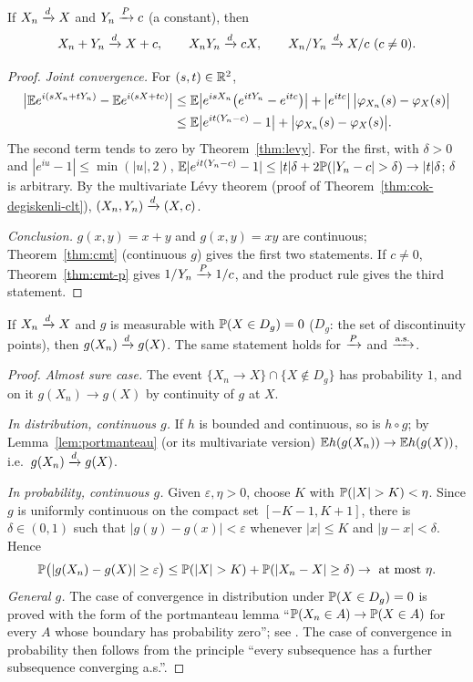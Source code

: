 \documentclass[main.tex]{subfiles}
\begin{document}
\begin{theorem}\label{thm:slutsky}
If $X_n\dto X$ and $Y_n\pto c$ (a constant), then
\[
X_n+Y_n\dto X+c,\qquad X_nY_n\dto cX,\qquad X_n/Y_n\dto X/c\ (c\neq0).
\]
\end{theorem}
\begin{proof}
\emph{Joint convergence.} For $(s,t)\in\R^2$,
\begin{align*}
\big|\E e^{i(sX_n+tY_n)}-\E e^{i(sX+tc)}\big|
&\le\E\big|e^{isX_n}\big(e^{itY_n}-e^{itc}\big)\big|+\big|e^{itc}\big|\,\big|\varphi_{X_n}(s)-\varphi_X(s)\big|\\
&\le\E\big|e^{it(Y_n-c)}-1\big|+\big|\varphi_{X_n}(s)-\varphi_X(s)\big|.
\end{align*}
The second term tends to zero by Theorem~\ref{thm:levy}. For the first, with $\delta>0$ and $|e^{iu}-1|\le\min(|u|,2)$, $\E|e^{it(Y_n-c)}-1|\le|t|\delta+2\P(|Y_n-c|>\delta)\to|t|\delta$; $\delta$ is arbitrary. By the multivariate Lévy theorem (proof of Theorem~\ref{thm:cok-degiskenli-clt}), $(X_n,Y_n)\dto(X,c)$.

\emph{Conclusion.} $g(x,y)=x+y$ and $g(x,y)=xy$ are continuous; Theorem~\ref{thm:cmt} (continuous $g$) gives the first two statements. If $c\ne0$, Theorem~\ref{thm:cmt-p} gives $1/Y_n\pto1/c$, and the product rule gives the third statement.
\end{proof}

\begin{theorem}\label{thm:cmt}
If $X_n\dto X$ and $g$ is measurable with $\P(X\in D_g)=0$ ($D_g$: the set of discontinuity points), then $g(X_n)\dto g(X)$. The same statement holds for $\pto$ and $\asto$.
\end{theorem}
\begin{proof}
\emph{Almost sure case.} The event $\{X_n\to X\}\cap\{X\notin D_g\}$ has probability $1$, and on it $g(X_n)\to g(X)$ by continuity of $g$ at $X$.

\emph{In distribution, continuous $g$.} If $h$ is bounded and continuous, so is $h\circ g$; by Lemma~\ref{lem:portmanteau} (or its multivariate version) $\E h(g(X_n))\to\E h(g(X))$, i.e.\ $g(X_n)\dto g(X)$.

\emph{In probability, continuous $g$.} Given $\varepsilon,\eta>0$, choose $K$ with $\P(|X|>K)<\eta$. Since $g$ is uniformly continuous on the compact set $[-K-1,K+1]$, there is $\delta\in(0,1)$ such that $|g(y)-g(x)|<\varepsilon$ whenever $|x|\le K$ and $|y-x|<\delta$. Hence
\[
\P\big(|g(X_n)-g(X)|\ge\varepsilon\big)\le\P(|X|>K)+\P(|X_n-X|\ge\delta)\to\text{ at most }\eta .
\]
\emph{General $g$.} The case of convergence in distribution under $\P(X\in D_g)=0$ is proved with the form of the portmanteau lemma ``$\P(X_n\in A)\to\P(X\in A)$ for every $A$ whose boundary has probability zero''; see \cite[Theorem~2.3]{vdv}. The case of convergence in probability then follows from the principle ``every subsequence has a further subsequence converging a.s.''.
\end{proof}
\end{document}
